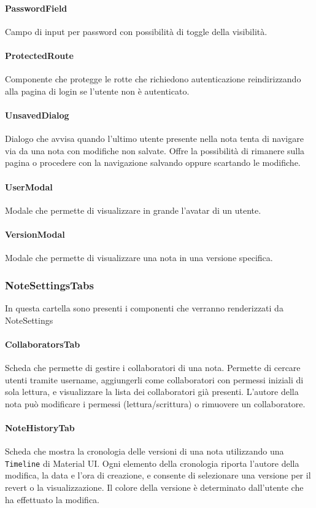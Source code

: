 \documentclass[11pt]{article}
\begin{document}
\paragraph{PasswordField}  
Campo di input per password con possibilità di toggle della visibilità.

\paragraph{ProtectedRoute}
Componente che protegge le rotte che richiedono autenticazione reindirizzando alla pagina di login se l’utente non è autenticato.

\paragraph{UnsavedDialog}
Dialogo che avvisa quando l'ultimo utente presente nella nota tenta di navigare via da una nota con modifiche non salvate. 
Offre la possibilità di rimanere sulla pagina o procedere con la navigazione salvando oppure scartando le modifiche.

\paragraph{UserModal}
Modale che permette di visualizzare in grande l'avatar di un utente.

\paragraph{VersionModal}
Modale che permette di visualizzare una nota in una versione specifica.

\subsubsection{NoteSettingsTabs}
In questa cartella sono presenti i componenti che verranno renderizzati da NoteSettings
\paragraph{CollaboratorsTab} 
Scheda che permette di gestire i collaboratori di una nota. Permette di cercare utenti tramite username, aggiungerli come collaboratori con permessi iniziali di sola lettura, e visualizzare la lista dei collaboratori già presenti. 
L’autore della nota può modificare i permessi (lettura/scrittura) o rimuovere un collaboratore.

\paragraph{NoteHistoryTab} 
Scheda che mostra la cronologia delle versioni di una nota utilizzando una \texttt{Timeline} di Material UI. 
Ogni elemento della cronologia riporta l’autore della modifica, la data e l’ora di creazione, e consente di selezionare una versione per il revert o la visualizzazione. 
Il colore della versione è determinato dall’utente che ha effettuato la modifica.
\end{document}
